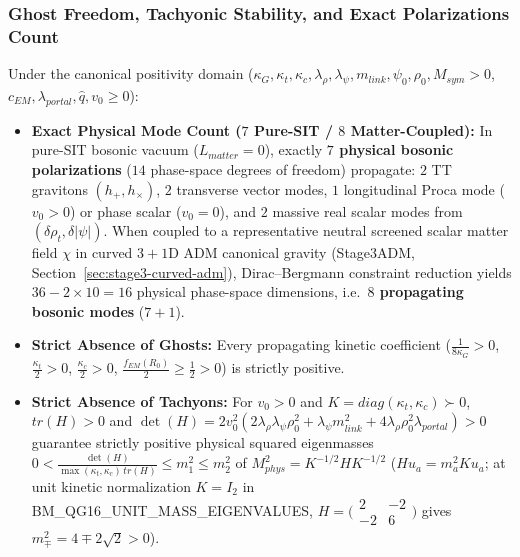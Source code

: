 \documentclass[american,11pt,letterpaper]{article}
\def\mathcal#1{#1}%
\def\mathrm#1{#1}%
\def\texttt#1{#1}%
\begin{document}
\subsubsection{Ghost Freedom, Tachyonic Stability, and Exact Polarizations Count}

Under the canonical positivity domain ($\kappa_G, \kappa_t, \kappa_c, \lambda_\rho, \lambda_\psi, m_{\mathrm{link}}, \psi_0, \rho_0, M_{\mathrm{sym}} > 0$, $c_{\mathrm{EM}}, \lambda_{\mathrm{portal}}, \hat{q}, v_0 \ge 0$):
\begin{itemize}
  \item \textbf{Exact Physical Mode Count ($7$ Pure-SIT / $8$ Matter-Coupled):} In pure-SIT bosonic vacuum ($\mathcal{L}_{\mathrm{matter}} = 0$), exactly \textbf{$7$ physical bosonic polarizations} ($14$ phase-space degrees of freedom) propagate: $2$ TT gravitons $(h_+, h_\times)$, $2$ transverse vector modes, $1$ longitudinal Proca mode ($v_0 > 0$) or phase scalar ($v_0 = 0$), and $2$ massive real scalar modes from $(\delta\rho_t, \delta|\psi|)$. When coupled to a representative neutral screened scalar matter field $\chi$ in curved $3+1$D ADM canonical gravity (\texttt{Stage3ADM}, Section~\ref{sec:stage3-curved-adm}), Dirac--Bergmann constraint reduction yields $36 - 2\times 10 = 16$ physical phase-space dimensions, i.e.\ \textbf{$8$ propagating bosonic modes} ($7 + 1$).
  \item \textbf{Strict Absence of Ghosts:} Every propagating kinetic coefficient ($\frac{1}{8\kappa_G} > 0$, $\frac{\kappa_t}{2} > 0$, $\frac{\kappa_c}{2} > 0$, $\frac{f_{\mathrm{EM}}(R_0)}{2} \ge \frac{1}{2} > 0$) is strictly positive.
  \item \textbf{Strict Absence of Tachyons:} For $v_0 > 0$ and $K = \mathrm{diag}(\kappa_t, \kappa_c) \succ 0$, $\mathrm{tr}(H) > 0$ and $\det(H) = 2v_0^2(2\lambda_\rho\lambda_\psi\rho_0^2 + \lambda_\psi m_{\mathrm{link}}^2 + 4\lambda_\rho\rho_0^2\lambda_{\mathrm{portal}}) > 0$ guarantee strictly positive physical squared eigenmasses $0 < \frac{\det(H)}{\max(\kappa_t,\kappa_c)\,\mathrm{tr}(H)} \le m_1^2 \le m_2^2$ of $M_{\mathrm{phys}}^2 = K^{-1/2} H K^{-1/2}$ ($H u_a = m_a^2 K u_a$; at unit kinetic normalization $K = I_2$ in \texttt{BM\_\allowbreak{}QG16\_\allowbreak{}UNIT\_\allowbreak{}MASS\_\allowbreak{}EIGENVALUES}, $H = \bigl(\begin{smallmatrix}2 & -2\\ -2 & 6\end{smallmatrix}\bigr)$ gives $m_\mp^2 = 4 \mp 2\sqrt{2} > 0$).
\end{itemize}
\end{document}
